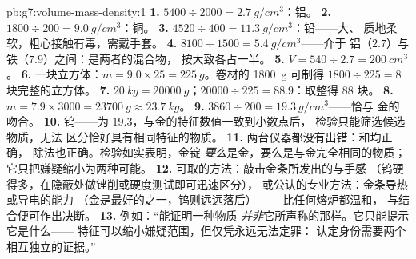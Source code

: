 \begin{solution}{pb:g7:volume-mass-density:1}
\textbf{1.} $5400 \div 2000 = \qty{2.7}{g/cm^3}$：铝。
\textbf{2.} $1800 \div 200 = \qty{9.0}{g/cm^3}$：铜。
\textbf{3.} $4520 \div 400 = \qty{11.3}{g/cm^3}$：铅——大、
质地柔软，粗心接触有毒，需戴手套。
\textbf{4.} $8100 \div 1500 = \qty{5.4}{g/cm^3}$——介于
铝（$2.7$）与铁（$7.9$）之间：是两者的混合物，
按大致各占一半。
\textbf{5.} $V = 540 \div 2.7 = \qty{200}{cm^3}$。
\textbf{6.} 一块立方体：$m = 9.0 \times 25 = \qty{225}{g}$。卷材的
\qty{1800}{g} 可制得 $1800 \div 225 = 8$ 块完整的立方体。
\textbf{7.} $\qty{20}{kg} = \qty{20000}{g}$；$20000 \div 225 =
88.9$：取整得 $88$ 块。
\textbf{8.}  $m = 7.9 \times 3000 = \qty{23700}{g} \approx
\qty{23.7}{kg}$。
\textbf{9.} $3860 \div 200 = \qty{19.3}{g/cm^3}$——恰与
金的吻合。
\textbf{10.} 钨——为 $19.3$，与金的特征数值一致到小数点后，
检验只能筛选候选物质，无法
区分恰好具有相同特征的物质。
\textbf{11.} 两台仪器都没有出错：和均正确，
除法也正确。检验如实表明，金锭
\emph{要么}是金，要么是与金完全相同的物质；
它只把嫌疑缩小为两种可能。
\textbf{12.} 可取的方法：敲击金条所发出的与手感
（钨硬得多，在隐蔽处做锉削或硬度测试即可迅速区分），
或公认的专业方法：金条导热或导电的能力
（金是最好的之一，钨则远远落后）——
比任何熔炉都温和，
与结合便可作出决断。
\textbf{13.} 例如：“能证明一种物质
\emph{并非}它所声称的那样。它只能提示它是什么——
特征可以缩小嫌疑范围，但仅凭永远无法定罪：
认定身份需要两个相互独立的证据。”
\end{solution}
